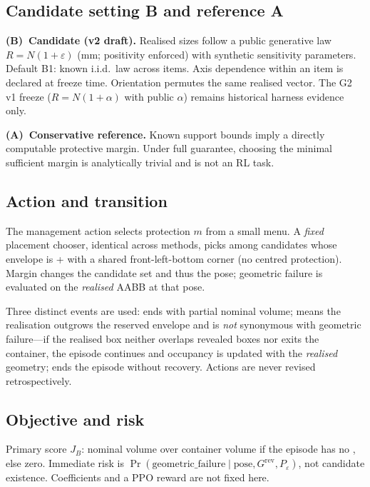 \subsection*{Candidate setting B and reference A}
\textbf{(B)~Candidate (v2 draft).} Realised sizes follow a public generative
law \(R=N(1+\varepsilon)\) (mm; positivity enforced) with synthetic sensitivity
parameters. Default B1: known i.i.d.\ law across items. Axis dependence within
an item is declared at freeze time. Orientation permutes the same realised
vector. The G2 v1 freeze (\(R=N(1+\alpha)\) with public \(\alpha\)) remains
historical harness evidence only.

\textbf{(A)~Conservative reference.} Known support bounds imply a directly
computable protective margin. Under full guarantee, choosing the minimal
sufficient margin is analytically trivial and is not an RL task.

\subsection*{Action and transition}
The management action selects protection $m$ from a small menu. A
\emph{fixed} placement chooser, identical across methods, picks among
candidates whose envelope is
+ with a shared
front-left-bottom corner (no centred protection). Margin changes the candidate
set and thus the pose; geometric failure is evaluated on the \emph{realised}
AABB at that pose.

Three distinct events are used:  ends with partial
nominal volume;  means the realisation outgrows the
reserved envelope and is \emph{not} synonymous with geometric failure---if the
realised box neither overlaps revealed boxes nor exits the container, the
episode continues and occupancy is updated with the \emph{realised} geometry;
 ends the episode without recovery. Actions are never
revised retrospectively.

\subsection*{Objective and risk}
Primary score \(J_B\): nominal volume over container volume if the episode has
no , else zero. Immediate risk is
\(\Pr(\mathrm{geometric\_failure}\mid\mathrm{pose},G^{\mathrm{rev}},P_\varepsilon)\),
not candidate existence. Coefficients and a PPO reward are not fixed here.
